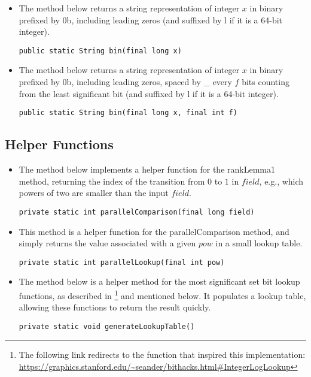 \begin{itemize}
    \item
    The method below returns a string representation of integer $x$ in binary prefixed by {\ttfamily 0b}, including leading zeros (and suffixed by {\ttfamily l} if it is a 64-bit integer).
    \begin{lstlisting}
public static String bin(final long x)
    \end{lstlisting}
    
    \item
    The method below returns a string representation of integer $x$ in binary prefixed by {\ttfamily 0b}, including leading zeros, spaced by {\ttfamily \_} every $f$ bits counting from the least significant bit (and suffixed by {\ttfamily l} if it is a 64-bit integer).
    \begin{lstlisting}
public static String bin(final long x, final int f)
    \end{lstlisting}
\end{itemize}

\subsection{Helper Functions}

\begin{itemize}
    \item
    The method below implements a helper function for the {\ttfamily rankLemma1} method, returning the index of the transition from $0$ to $1$ in $field$, e.g., which powers of two are smaller than the input $field$.
    \begin{lstlisting}
private static int parallelComparison(final long field)
    \end{lstlisting}

    \item
    This method is a helper function for the {\ttfamily parallelComparison} method, and simply returns the value associated with a given $pow$ in a small lookup table.
    \begin{lstlisting}
private static int parallelLookup(final int pow)
    \end{lstlisting}
    
    \item
    The method below is a helper method for the most significant set bit lookup functions, as described in \cite{bittricks}\footnote{The following link redirects to the function that inspired this implementation: \url{https://graphics.stanford.edu/~seander/bithacks.html\#IntegerLogLookup}} and mentioned below. It populates a lookup table, allowing these functions to return the result quickly. 
    \begin{lstlisting}
private static void generateLookupTable()
    \end{lstlisting}
\end{itemize}

